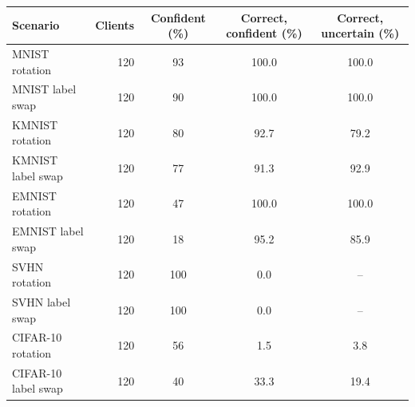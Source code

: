 \footnotesize
\begin{tabular}{lrccc}
\toprule
Scenario & Clients & Confident (\%) & Correct, confident (\%) & Correct, uncertain (\%) \\
\midrule
MNIST rotation & 120 & 93 & 100.0 & 100.0 \\
MNIST label swap & 120 & 90 & 100.0 & 100.0 \\
KMNIST rotation & 120 & 80 & 92.7 & 79.2 \\
KMNIST label swap & 120 & 77 & 91.3 & 92.9 \\
EMNIST rotation & 120 & 47 & 100.0 & 100.0 \\
EMNIST label swap & 120 & 18 & 95.2 & 85.9 \\
SVHN rotation & 120 & 100 & 0.0 & -- \\
SVHN label swap & 120 & 100 & 0.0 & -- \\
CIFAR-10 rotation & 120 & 56 & 1.5 & 3.8 \\
CIFAR-10 label swap & 120 & 40 & 33.3 & 19.4 \\
\bottomrule
\end{tabular}
